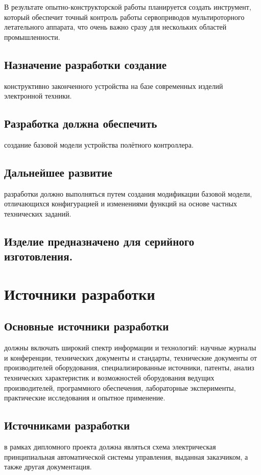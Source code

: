 \documentclass[a4paper]{bsuir-tor}
\begin{document}
  В результате опытно-конструкторской работы планируется создать
  инструмент, который обеспечит точный контроль работы сервоприводов
  мультироторного летательного аппарата, что очень важно сразу для
  нескольких областей промышленности.

  \subsection{ Назначение разработки создание }
  конструктивно законченного
  устройства на базе современных изделий электронной техники.

  \subsection{ Разработка должна обеспечить }
  создание базовой модели устройства полётного контроллера.

  \subsection{ Дальнейшее развитие }
  разработки должно выполняться путем создания модификации базовой
  модели, отличающихся конфигурацией и изменениями функций на основе
  частных технических заданий.

  \subsection{Изделие предназначено для серийного изготовления.}

\section{Источники разработки}

\subsection{Основные источники разработки }
должны включать широкий спектр информации и технологий: научные
журналы и конференции, технических документы и стандарты, технические
документы от производителей оборудования, специализированные
источники, патенты, анализ технических характеристик и возможностей
оборудования ведущих производителей, программного обеспечения,
лабораторные эксперименты, практические исследования и опытное
применение.

\subsection{Источниками разработки}
в рамках дипломного проекта должна являться схема электрическая
принципиальная автоматической системы управления, выданная заказчиком,
а также другая документация.
\end{document}
